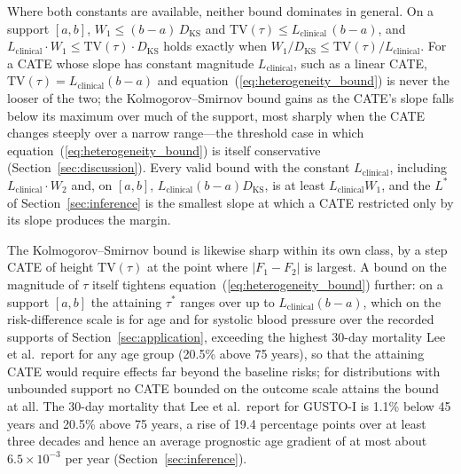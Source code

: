 \documentclass[AMA,Times1COL]{WileyNJDv5}
\begin{document}
Where both constants are available, neither bound dominates in general. On a support $[a, b]$, $W_1 \leq (b - a)\,D_{\text{KS}}$ and $\mathrm{TV}(\tau) \leq L_{\text{clinical}}\,(b - a)$, and $L_{\text{clinical}} \cdot W_1 \leq \mathrm{TV}(\tau) \cdot D_{\text{KS}}$ holds exactly when $W_1 / D_{\text{KS}} \leq \mathrm{TV}(\tau) / L_{\text{clinical}}$. For a CATE whose slope has constant magnitude $L_{\text{clinical}}$, such as a linear CATE, $\mathrm{TV}(\tau) = L_{\text{clinical}}(b - a)$ and equation~(\ref{eq:heterogeneity_bound}) is never the looser of the two; the Kolmogorov--Smirnov bound gains as the CATE's slope falls below its maximum over much of the support, most sharply when the CATE changes steeply over a narrow range---the threshold case in which equation~(\ref{eq:heterogeneity_bound}) is itself conservative (Section~\ref{sec:discussion}). Every valid bound with the constant $L_{\text{clinical}}$, including $L_{\text{clinical}} \cdot W_2$ and, on $[a, b]$, $L_{\text{clinical}} (b - a) D_{\text{KS}}$, is at least $L_{\text{clinical}} W_1$, and the $L^*$ of Section~\ref{sec:inference} is the smallest slope at which a CATE restricted only by its slope produces the margin.

The Kolmogorov--Smirnov bound is likewise sharp within its own class, by a step CATE of height $\mathrm{TV}(\tau)$ at the point where $|F_1 - F_2|$ is largest. A bound on the magnitude of $\tau$ itself tightens equation~(\ref{eq:heterogeneity_bound}) further: on a support $[a, b]$ the attaining $\tau^*$ ranges over up to $L_{\text{clinical}} (b - a)$, which on the risk-difference scale is  for age and  for systolic blood pressure over the recorded supports of Section~\ref{sec:application}, exceeding the highest 30-day mortality Lee et al.\ report for any age group (20.5\% above 75 years\cite{lee1995}), so that the attaining CATE would require effects far beyond the baseline risks; for distributions with unbounded support no CATE bounded on the outcome scale attains the bound at all. The 30-day mortality that Lee et al.\ report for GUSTO-I is 1.1\% below 45 years and 20.5\% above 75 years,\cite{lee1995} a rise of 19.4 percentage points over at least three decades and hence an average prognostic age gradient of at most about $6.5 \times 10^{-3}$ per year (Section~\ref{sec:inference}).

\end{document}

